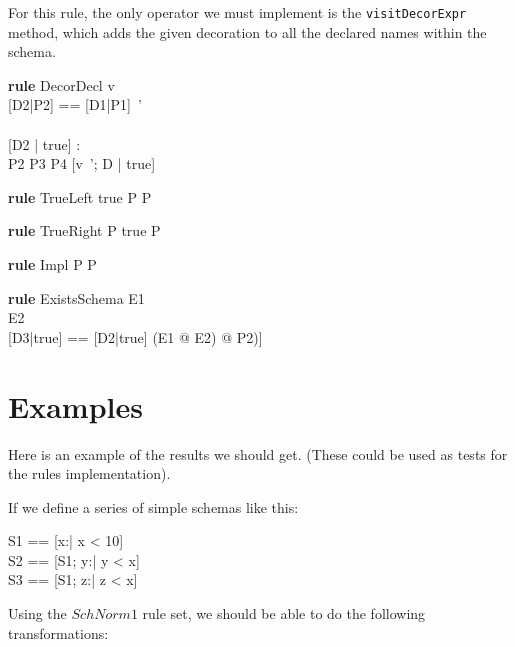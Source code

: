 \documentclass{article}
\newenvironment{zedrule}[1]{\par\textbf{rule }#1\vspace{-1ex}\infrule}{\endinfrule}
\newcommand{\derives}{\derive{}}
\newcommand{\proviso}{\raisebox{0.5ex}{${}_{\blacktriangleright}\ $}}%
\begin{document}
For this rule, the only operator we must implement is the
\verb!visitDecorExpr! method, which adds the given decoration to all the
declared names within the schema.

\begin{zedrule}{DecorDecl}
   v \unfoldsTo [D1 | P1] \\
   \proviso [D2|P2] == [D1|P1]~' \\
   [D | true] \unfoldsTo [D3 | P3] \\
   \proviso [D2 | true] \land [D3 | true] : \power [D4] \\
   P2 \land P3 \iff P4
\derives
   [v~'; D | true] \unfoldsTo [D4 | P4]
\end{zedrule}

\begin{zedrule}{TrueLeft}
  true \land P \iff P
\end{zedrule}

\begin{zedrule}{TrueRight}
  P \land true \iff P
\end{zedrule}

\begin{zedrule}{Impl}
  P \iff P
\end{zedrule}

\begin{zedrule}{ExistsSchema}
   E1 \unfoldsTo [D1 | P1] \\
   E2 \unfoldsTo [D2 | P2] \\
   \proviso [D3|true] == [D2|true] \schemaminus [D1|true]
\derives
   (\exists E1 @ E2) \unfoldsTo [D3 | (\exists [D1|P1] @ P2)]
\end{zedrule}


\section*{Examples}
Here is an example of the results we should get.
(These could be used as tests for the rules implementation).

If we define a series of simple schemas like this:

\begin{zed}
  S1 == [x:\nat | x < 10] \\
  S2 == [S1; y:\nat | y < x] \\
  S3 == [S1; z:\nat | z < x]
\end{zed}

Using the $SchNorm1$ rule set, we should be able to
do the following transformations:
\end{document}
